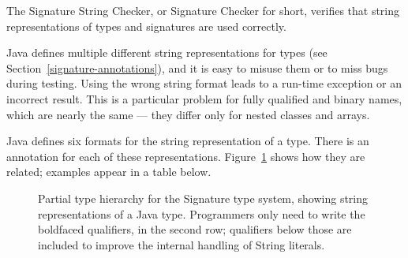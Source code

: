 \htmlhr
{}

The Signature String Checker, or Signature Checker for short, verifies that
string representations of types and signatures are used correctly.

Java defines multiple different string representations for types (see
Section~\ref{signature-annotations}), and it is easy to
misuse them or to miss bugs during testing.  Using the wrong string format
leads to a run-time exception or an incorrect result.  This is a particular
problem for fully qualified and binary names, which are nearly the same ---
they differ only for nested classes and arrays.



Java defines six formats for the string representation of a type.
There is an annotation for each of these representations.
Figure~\ref{fig-signature-hierarchy} shows how they are related;
examples appear in a table below.

\begin{figure}
\caption{Partial type hierarchy for the Signature type system, showing
  string representations of a Java type.  Programmers only need to write
  the boldfaced qualifiers, in the second row; qualifiers below those are
  included to improve the internal handling of String literals.}
\label{fig-signature-hierarchy}
\end{figure}

